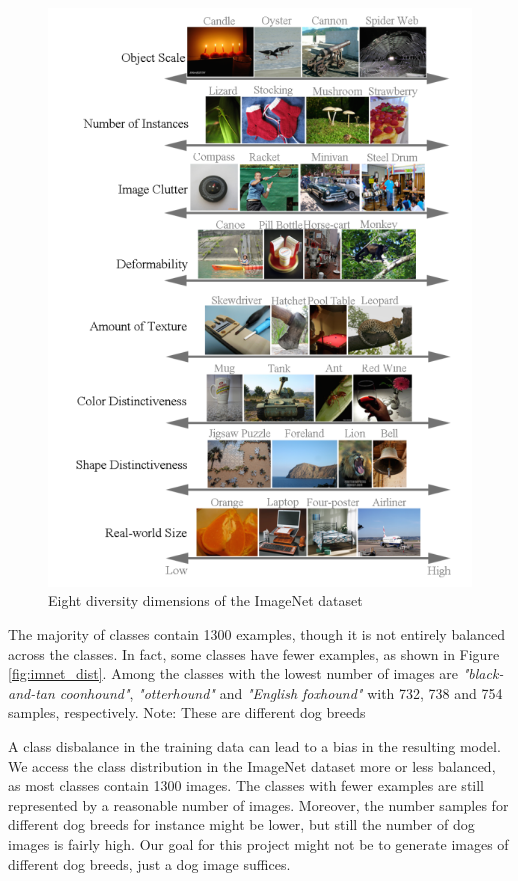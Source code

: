    \begin{figure}
        \centering
        \includegraphics[width=\textwidth]{../../sample_images/imnet_dimension.png}
        \caption{Eight diversity dimensions of the ImageNet dataset \cite{imagenet_breakdown}}
        \label{fig:imnet_dimensions}
   \end{figure}

    The majority of classes contain 1300 examples, though it is not entirely balanced across the classes. In fact, some classes have fewer examples, as shown in Figure \ref{fig:imnet_dist}. Among the classes with the lowest number of images are \textit{"black-and-tan coonhound"}, \textit{"otterhound"} and \textit{"English foxhound"} with 732, 738 and 754 samples, respectively. Note: These are different dog breeds

    A class disbalance in the training data can lead to a bias in the resulting model. We access the class distribution in the ImageNet dataset more or less balanced, as most classes contain 1300 images. The classes with fewer examples are still represented by a reasonable number of images. Moreover, the number samples for different dog breeds for instance might be lower, but still the number of dog images is fairly high. Our goal for this project might not be to generate images of different dog breeds, just a dog image suffices.

